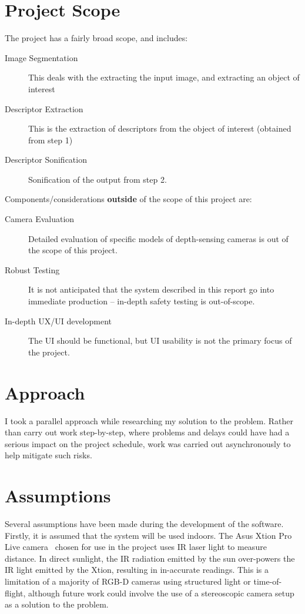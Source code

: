 \section{Project Scope}
The project has a fairly broad scope, and includes:
\begin{description}
    \item[Image Segmentation] This deals with the extracting the input image, and extracting an object of interest
    \item[Descriptor Extraction] This is the extraction of descriptors from the object of interest (obtained from step 1)
    \item[Descriptor Sonification] Sonification of the output from step 2.
\end{description}

Components/considerations \textbf{outside} of the scope of this project are:
\begin{description}
    \item[Camera Evaluation] Detailed evaluation of specific models of depth-sensing cameras is out of the scope of this project. 
    \item[Robust Testing] It is not anticipated that the system described in this report go into immediate production -- in-depth safety testing is out-of-scope. 
    \item[In-depth UX/UI development] The UI should be functional, but UI usability is not the primary focus of the project. 
\end{description}

\section{Approach}
I took a parallel approach while researching my solution to the problem. Rather than carry out work step-by-step, where problems and delays could have had a serious impact on the project schedule, work was carried out asynchronously to help mitigate such risks. 

\section{Assumptions}
Several assumptions have been made during the development of the software. Firstly, it is assumed that the system will be used indoors. The Asus Xtion Pro Live camera~\cite{xtion} chosen for use in the project uses \ac{IR} laser light to measure distance. In direct sunlight, the \ac{IR} radiation emitted by the sun over-powers the \ac{IR} light emitted by the Xtion, resulting in in-accurate readings. This is a limitation of a majority of \ac{RGB-D} cameras using structured light or time-of-flight, although future work could involve the use of a stereoscopic camera setup as a solution to the problem.

